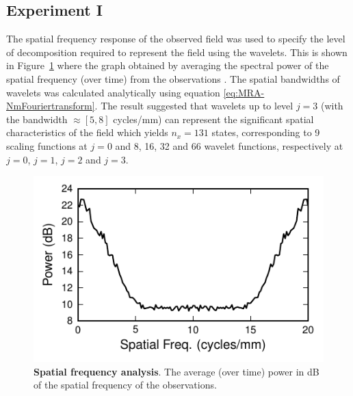 \documentclass[11pt,draftcls,onecolumn,peerreview]{IEEEtran}
\begin{document}
\subsection{Experiment I}
The spatial frequency response of the observed field was used to specify the level of decomposition required to represent the field using the wavelets. This is shown in Figure~\ref{fig:ObservationFrequencyResponce} where the graph obtained by averaging the spectral power of the spatial frequency (over time) from the observations \cite{Scerri2009}. The spatial bandwidths of wavelets was calculated analytically using equation \eqref{eq:MRA-NmFouriertransform}. The result suggested that wavelets up to level $j=3$ (with the bandwidth $\approx[5,8]$ cycles/mm) can represent the significant spatial characteristics of the field which yields $n_x = 131$ states, corresponding to 9 scaling functions at $j=0$ and 8, 16, 32 and 66 wavelet functions, respectively at $j=0$, $j=1$, $j=2$ and $j=3$. 
\begin{figure}[!t] 
 	\centering
 		\includegraphics[scale=1]{./Graph/Figure2.pdf}
 		\caption{{\bf Spatial frequency analysis}. The average (over time) power in dB of the spatial frequency of the observations.}
 	\label{fig:ObservationFrequencyResponce}
 \end{figure}
\end{document}
